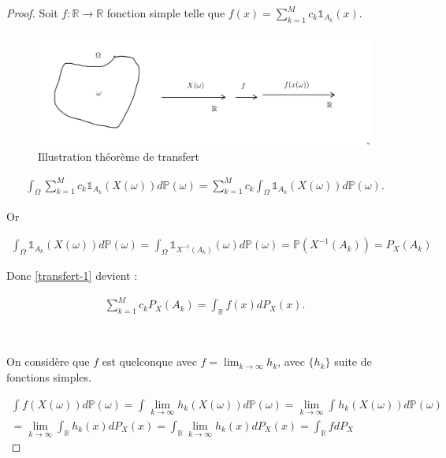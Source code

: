 \documentclass[french]{book}
\theoremstyle{definition}
\theoremstyle{remark}
\begin{document}
\begin{proof}
  Soit $f : \mathbb{R} \to \mathbb{R}$ fonction simple telle que $f(x) = \sum_{k=1}^{M} c_k \mathds{1} _{A_k}(x) $.

    \begin{figure}[h!]
      \centering
      \includegraphics[scale=0.3]{figures/transfert.png}
      \caption{Illustration théorème de transfert}
      \label{}
    \end{figure}

  \begin{gather}\label{transfert-1}
    \int_{\Omega}^{} \sum_{k=1}^{M} c_k \mathds{1} _{A_k}(X (\omega)) d \mathbb{P}( \omega )  = \sum_{k=1}^{M} c_k \int_{\Omega}^{} \mathds{1} _{A_k}(X(\omega)) d \mathbb{P}( \omega ).
  \end{gather}

  Or

  \begin{gather*}
    \int_{\Omega}^{} \mathds{1} _{A_k}(X (\omega)) d \mathbb{P}( \omega ) = \int_{\Omega}^{} \mathds{1} _{X ^{-1} (A_k)}(\omega) d \mathbb{P}( \omega ) = \mathbb{P}( X ^{-1} (A_k) ) = P_X (A_k)
  \end{gather*}

  Donc \ref{transfert-1} devient :

  \begin{gather*}
    \sum_{k=1}^{M} c_k P_X(A_k) = \int_{\mathbb{R}}^{} f(x) d P_X(x).
  \end{gather*}

  \

  On considère que $f$ est quelconque avec $f = \lim_{k \to \infty} h_k$, avec $\{ h_k \} $ suite de fonctions simples.

  \begin{gather*}
    \int_{}^{} f(X(\omega)) d \mathbb{P}( \omega ) = \int_{}^{} \lim_{k \to \infty}   h_k(X(\omega)) d \mathbb{P}( \omega ) = \lim_{k \to \infty} \int_{}^{} h_k (X(\omega)) d \mathbb{P}( \omega ) \\
    =\lim_{k \to \infty} \int_{\mathbb{R}}^{} h_k(x) d P_X(x) =  \int_{\mathbb{R}}^{} \lim_{k \to \infty} h_k(x) d P_X(x) = \int_{\mathbb{R}}^{} f d P_X
  \end{gather*}

\end{proof}
\end{document}
